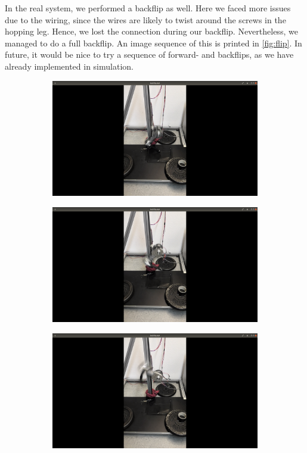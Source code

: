 \documentclass[onecolumn, letter paper]{report}
\begin{document}
In the real system, we performed a backflip as well. Here we faced more issues due to the wiring, since the wires are likely to twist around the screws in the hopping leg. Hence, we lost the connection during our backflip. Nevertheless, we managed to do a full backflip. An image sequence of this is printed in \autoref{fig:flip}.
In future, it would be nice to try a sequence of forward- and backflips, as we have already implemented in simulation.

\begin{figure}[htb!]
    \centering
    \begin{subfigure}{.16\textwidth}
    \includegraphics[width=\textwidth, trim={27cm 10cm 27cm 5cm}, clip]{figures/backflip/b1.png}
    \end{subfigure}
    \begin{subfigure}{.16\textwidth}
    \includegraphics[width=\textwidth, trim={27cm 10cm 27cm 5cm}, clip]{figures/backflip/b2.png}
    \end{subfigure}
    \begin{subfigure}{.16\textwidth}
    \includegraphics[width=\textwidth, trim={27cm 10cm 27cm 5cm}, clip]{figures/backflip/b3.png}

\end{subfigure}
\end{figure}
\end{document}
